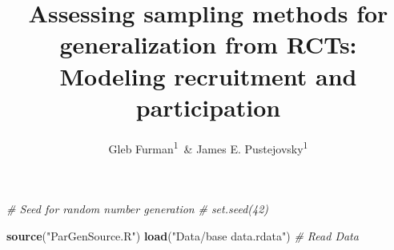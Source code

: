\documentclass[man]{apa6}
\title{Assessing sampling methods for generalization from RCTs: Modeling recruitment and participation}
\author{Gleb Furman\textsuperscript{1}~\& James E. Pustejovsky\textsuperscript{1}}
\date{}
\affiliation{
\vspace{0.5cm}
\textsuperscript{1} University of Texas at Austin}
\newenvironment{Shaded}{\begin{snugshade}}{\end{snugshade}}
\newcommand{\CommentTok}[1]{\textcolor[rgb]{0.56,0.35,0.01}{\textit{#1}}}
\newcommand{\KeywordTok}[1]{\textcolor[rgb]{0.13,0.29,0.53}{\textbf{#1}}}
\newcommand{\NormalTok}[1]{#1}
\newcommand{\StringTok}[1]{\textcolor[rgb]{0.31,0.60,0.02}{#1}}
\begin{document}
\maketitle

\begin{Shaded}
\begin{Highlighting}[]
\CommentTok{# Seed for random number generation}
\CommentTok{# set.seed(42)}
\end{Highlighting}
\end{Shaded}

\begin{Shaded}
\begin{Highlighting}[]
\KeywordTok{source}\NormalTok{(}\StringTok{"ParGenSource.R"}\NormalTok{)}
\KeywordTok{load}\NormalTok{(}\StringTok{"Data/base data.rdata"}\NormalTok{)}
\CommentTok{# Read Data}
\end{Highlighting}
\end{Shaded}
\end{document}
